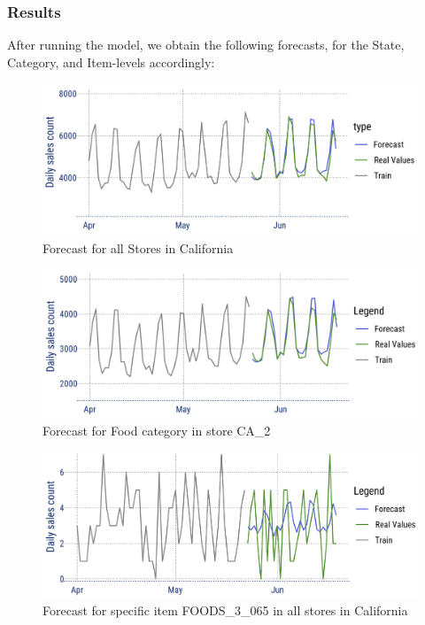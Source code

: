 \documentclass[12pt]{article}
\begin{document}
\newpage

\subsubsection*{Results}

After running the model, we obtain the following forecasts, for the State, Category, and Item-levels accordingly:

\begin{figure}[H]
    \centering
    \includegraphics[width=\textwidth]{Images/calforecast.png}
    \caption{Forecast for all Stores in California}
    \label{fig:6-calforecast}
\end{figure} 

\begin{figure}[H]
    \centering
    \includegraphics[width=\textwidth]{Images/foodsforecast.png}
    \caption{Forecast for Food category in store CA\_2}
    \label{fig:6-foodforecast}
\end{figure} 

\begin{figure}[H]
    \centering
    \includegraphics[width=\textwidth]{Images/itemforecast.png}
    \caption{Forecast for specific item FOODS\_3\_065 in all stores in California}
    \label{fig:6-itemforecast}
\end{figure} 
\end{document}
